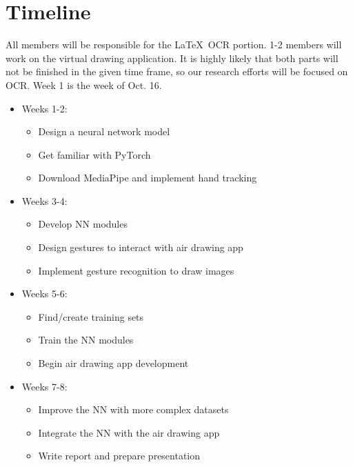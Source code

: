 \section{Timeline}
\label{sec:timeline}

All members will be responsible for the \LaTeX\ OCR portion. 1-2 members will work on the virtual drawing application. It is highly likely that both parts will not be finished in the given time frame, so our research efforts will be focused on OCR. Week 1 is the week of Oct. 16.

\begin{itemize}
    \item Weeks 1-2: 
        \begin{itemize}
            \item Design a neural network model
            \item Get familiar with PyTorch
            \item Download MediaPipe and implement hand tracking
        \end{itemize}
    \item Weeks 3-4:
        \begin{itemize}
            \item Develop NN modules
            \item Design gestures to interact with air drawing app
            \item Implement gesture recognition to draw images
        \end{itemize}
    \item Weeks 5-6:
        \begin{itemize}
            \item Find/create training sets
            \item Train the NN modules
            \item Begin air drawing app development
        \end{itemize}
    \item Weeks 7-8:
        \begin{itemize}
            \item Improve the NN with more complex datasets
            \item Integrate the NN with the air drawing app
            \item Write report and prepare presentation
        \end{itemize}
\end{itemize}

